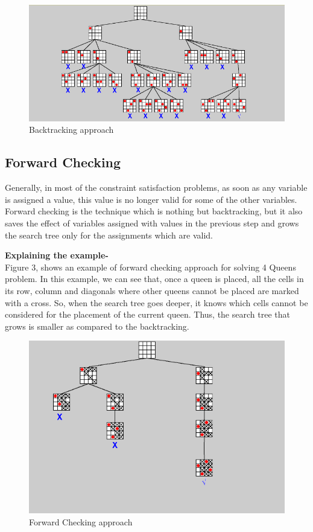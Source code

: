 \documentclass[conference]{IEEEtran}
\begin{document}
\begin{figure}
\includegraphics[scale=0.5]{Backtracking.png}
\caption{Backtracking approach}
\label{Figure2}
\end{figure}


\subsection{Forward Checking}

Generally, in most of the constraint satisfaction problems, as soon as any variable is assigned a value, this value is no longer valid for some of the other variables. Forward checking is the technique which is nothing but backtracking, but it also saves the effect of variables assigned with values in the previous step and grows the search tree only for the assignments which are valid.

 \textbf{Explaining the example- }
\\ Figure 3, shows an example of forward checking approach for solving 4 Queens problem. In this example, we can see that, once a queen is placed, all the cells in its row, column and diagonals where other queens cannot be placed are marked with a cross. So, when the search tree goes deeper, it knows which cells cannot be considered for the placement of the current queen. Thus, the search tree that grows is smaller as compared to the backtracking. 

\begin{figure}
\includegraphics[scale=0.65]{ForwardChecking.png}
\caption{Forward Checking approach}
\label{Figure3}
\end{figure}
\end{document}
